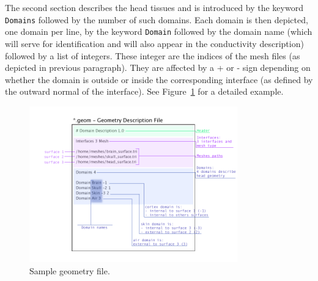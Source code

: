 \documentclass[10pt,journal]{book}
\newcommand{\example}[1]{\framebox[0.95\linewidth][l]{\parbox[t]{.93\linewidth}{\ttfamily \tiny #1}}}
\begin{document}
    \medskip

    The second section describes the head tissues and is introduced by the keyword {\tt Domains} followed by the number of such domains. Each domain is then
    depicted, one domain per line, by the keyword {\tt Domain} followed by the domain name (which will serve for identification and will also appear in the
    conductivity description) followed by a list of integers. These integer are the indices of the mesh files (as depicted in previous paragraph). They are
    affected by a + or - sign depending on whether the domain is outside or inside the corresponding interface (as defined by the outward normal of the interface).
    See Figure~\ref{fig:geom} for a detailed example.
    \begin{figure}[ht!]
    \includegraphics[width=9cm]{geom.png}
    \caption{Sample geometry file.}
    \label{fig:geom}
    \end{figure}
%


\end{document}
